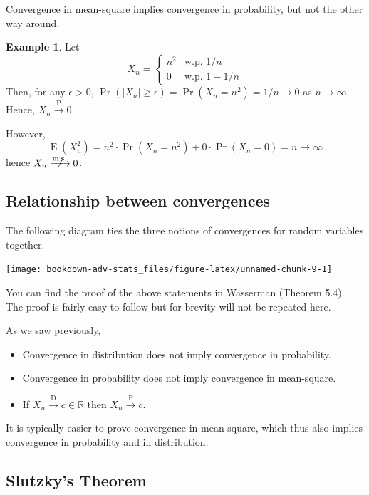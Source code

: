 \documentclass[
]{book}
\providecommand{\tightlist}{%
  \setlength{\itemsep}{0pt}\setlength{\parskip}{0pt}}
\DeclareMathOperator{\E}{E}
\newcommand{\bbR}{\mathbb{R}}
\theoremstyle{definition}
\theoremstyle{definition}
\newtheorem{example}{Example}[chapter]
\theoremstyle{definition}
\theoremstyle{definition}
\theoremstyle{remark}
\begin{document}
Convergence in mean-square implies convergence in probability, but \uline{not the other way around}.

\begin{example}
Let
\[ X_n = 
    \begin{cases}
      n^2 &\text{w.p. } 1/n \\
      0 &\text{w.p. } 1- 1/n  
    \end{cases}\]
Then, for any \(\epsilon>0\),
\(\Pr(|X_n|\geq\epsilon) = \Pr(X_n = n^2) = 1/n \to 0\) as \(n\to\infty\).
Hence, \(X_n{\xrightarrow{\text{P}}}0\).

However, \[\E(X_n^2) = n^2 \cdot \Pr(X_n = n^2) + 0  \cdot \Pr(X_n = 0) = n \to \infty\] hence
\(X_n\centernot{\xrightarrow{\text{m.s.}}}0\).
\end{example}

\hypertarget{relationship-between-convergences}{%
\subsection{Relationship between convergences}\label{relationship-between-convergences}}

The following diagram ties the three notions of convergences for random variables together.

\begin{center}\texttt{[image: bookdown-adv-stats\_files/figure-latex/unnamed-chunk-9-1]} \end{center}

You can find the proof of the above statements in Wasserman (Theorem 5.4). The proof is fairly easy to follow but for brevity will not be repeated here.

As we saw previously,

\begin{itemize}
\tightlist
\item
  Convergence in distribution does not imply convergence in probability.
\item
  Convergence in probability does not imply convergence in mean-square.
\item
  If \(X_n \xrightarrow{\text{D}}c\in\bbR\) then \(X_n \xrightarrow{\text{P}}c\).
\end{itemize}

It is typically easier to prove convergence in mean-square, which thus also implies convergence in probability and in distribution.

\hypertarget{slutzkys-theorem}{%
\subsection{Slutzky's Theorem}\label{slutzkys-theorem}}
\end{document}
